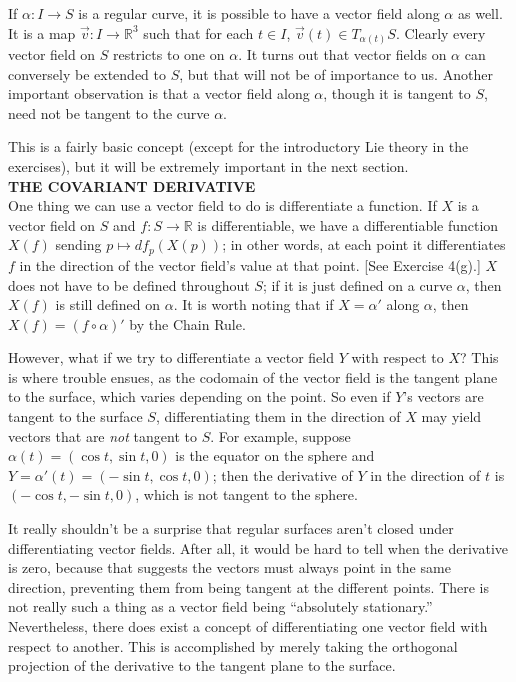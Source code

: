 \documentclass[leqno]{book}
\begin{document}
If $\alpha:I\to S$ is a regular curve, it is possible to have a vector field along $\alpha$ as well.  It is a map $\vec v:I\to\mathbb R^3$ such that for each $t\in I$, $\vec v(t)\in T_{\alpha(t)}S$.  Clearly every vector field on $S$ restricts to one on $\alpha$.  It turns out that vector fields on $\alpha$ can conversely be extended to $S$, but that will not be of importance to us.  Another important observation is that a vector field along $\alpha$, though it is tangent to $S$, need not be tangent to the curve $\alpha$.

This is a fairly basic concept (except for the introductory Lie theory in the exercises), but it will be extremely important in the next section.\\

\noindent\textbf{THE COVARIANT DERIVATIVE}\\

\noindent One thing we can use a vector field to do is differentiate a function.  If $X$ is a vector field on $S$ and $f:S\to\mathbb R$ is differentiable, we have a differentiable function $X(f)$ sending $p\mapsto df_p(X(p))$; in other words, at each point it differentiates $f$ in the direction of the vector field's value at that point.  [See Exercise 4(g).]
$X$ does not have to be defined throughout $S$; if it is just defined on a curve $\alpha$, then $X(f)$ is still defined on $\alpha$.  It is worth noting that if $X=\alpha'$ along $\alpha$, then $X(f)=(f\circ\alpha)'$ by the Chain Rule.

However, what if we try to differentiate a vector field $Y$ with respect to $X$?  This is where trouble ensues, as the codomain of the vector field is the tangent plane to the surface, which varies depending on the point.  So even if $Y$'s vectors are tangent to the surface $S$, differentiating them in the direction of $X$ may yield vectors that are \emph{not} tangent to $S$.  For example, suppose $\alpha(t)=(\cos t,\sin t,0)$ is the equator on the sphere and $Y=\alpha'(t)=(-\sin t,\cos t,0)$; then the derivative of $Y$ in the direction of $t$ is $(-\cos t,-\sin t,0)$, which is not tangent to the sphere.

It really shouldn't be a surprise that regular surfaces aren't closed under differentiating vector fields.  After all, it would be hard to tell when the derivative is zero, because that suggests the vectors must always point in the same direction, preventing them from being tangent at the different points.  There is not really such a thing as a vector field being ``absolutely stationary.''  Nevertheless, there does exist a concept of differentiating one vector field with respect to another.  This is accomplished by merely taking the orthogonal projection of the derivative to the tangent plane to the surface.
\end{document}

